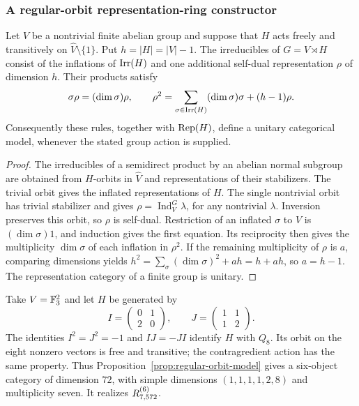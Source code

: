 \subsubsection{A regular-orbit representation-ring constructor}
\begin{proposition}\label{prop:regular-orbit-model}
Let $V$ be a nontrivial finite abelian group and suppose that $H$ acts
freely and transitively on $\widehat V\setminus\{1\}$. Put
$h=|H|=|V|-1$. The irreducibles of $G=V\rtimes H$ consist of the
inflations of $\operatorname{Irr}(H)$ and one additional self-dual representation
$\rho$ of dimension $h$. Their products satisfy
\begin{equation}\label{eq:regular-orbit-products}
 \sigma\rho=(\dim\sigma)\rho,\qquad
 \rho^2=\sum_{\sigma\in\operatorname{Irr}(H)}(\dim\sigma)\sigma+(h-1)\rho.
\end{equation}
Consequently these rules, together with $\operatorname{Rep}(H)$, define a unitary
categorical model, whenever the stated group action is supplied.
\end{proposition}
\begin{proof}
The irreducibles of a semidirect product by an abelian normal subgroup
are obtained from $H$-orbits in $\widehat V$ and representations of their
stabilizers. The trivial orbit gives the inflated representations of
$H$. The single nontrivial orbit has trivial stabilizer and gives
$\rho=\operatorname{Ind}_V^G\lambda$, for any nontrivial $\lambda$.
Inversion preserves this orbit, so $\rho$ is self-dual. Restriction of
an inflated $\sigma$ to $V$ is $(\dim\sigma)1$, and induction gives
the first equation. Its reciprocity then gives the multiplicity
$\dim\sigma$ of each inflation in $\rho^2$. If the remaining
multiplicity of $\rho$ is $a$, comparing dimensions yields
$h^2=\sum_\sigma(\dim\sigma)^2+ah=h+ah$, so $a=h-1$.
The representation category of a finite group is unitary.
\end{proof}

Take $V=\mathbb F_3^2$ and let $H$ be generated by
\[
 I=\begin{pmatrix}0&1\\2&0\end{pmatrix},\qquad
 J=\begin{pmatrix}1&1\\1&2\end{pmatrix}.
\]
The identities $I^2=J^2=-1$ and $IJ=-JI$ identify $H$ with $Q_8$.
Its orbit on the eight nonzero vectors is free and transitive; the
contragredient action has the same property. Thus
Proposition~\ref{prop:regular-orbit-model} gives a six-object category
of dimension $72$, with simple dimensions $(1,1,1,1,2,8)$ and
multiplicity seven. It realizes $R^{(6)}_{7,572}$.

